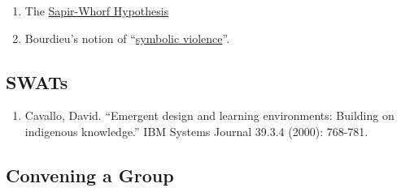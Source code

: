 \begin{enumerate}
\def\labelenumi{\arabic{enumi}.}
\item
  The
  \href{http://en.wikipedia.org/wiki/Linguistic_relativity}{Sapir-Whorf
  Hypothesis}
\item
  Bourdieu's notion of
  ``\href{http://en.wikipedia.org/wiki/Symbolic_violence}{symbolic
  violence}''.
\end{enumerate}

\subsection{SWATs}\label{rec:swats}

\begin{enumerate}
\def\labelenumi{\arabic{enumi}.}
\itemsep1pt\parskip0pt
\item
  Cavallo, David. ``Emergent design and learning environments: Building
  on indigenous knowledge.'' IBM Systems Journal 39.3.4 (2000): 768-781.
\end{enumerate}

\subsection{Convening a Group}\label{rec:convening-a-group}

